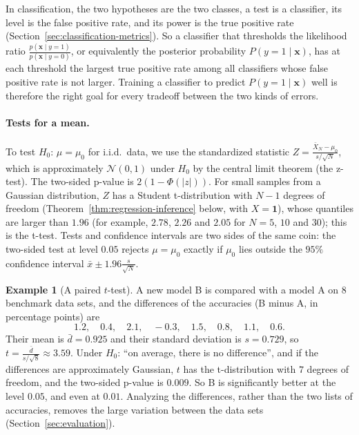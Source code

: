 \documentclass[11pt]{article}
\theoremstyle{definition}
\newtheorem{example}[definition]{Example}
\theoremstyle{plain}
\theoremstyle{remark}
\begin{document}
In classification, the two hypotheses are the two classes, a test is a classifier, its level is the false positive rate, and its power is the true positive rate (Section~\ref{sec:classification-metrics}). So a classifier that thresholds the likelihood ratio $\frac{p(\mathbf{x} \mid y = 1)}{p(\mathbf{x} \mid y = 0)}$, or equivalently the posterior probability $P(y = 1 \mid \mathbf{x})$, has at each threshold the largest true positive rate among all classifiers whose false positive rate is not larger. Training a classifier to predict $P(y = 1 \mid \mathbf{x})$ well is therefore the right goal for every tradeoff between the two kinds of errors.

\paragraph{Tests for a mean.} To test $H_0$: $\mu = \mu_0$ for i.i.d.\ data, we use the standardized statistic $Z = \frac{\bar X_N - \mu_0}{s/\sqrt{N}}$, which is approximately $\mathcal{N}(0, 1)$ under $H_0$ by the central limit theorem (the z-test). The two-sided p-value is $2(1 - \Phi(|z|))$. For small samples from a Gaussian distribution, $Z$ has a Student t-distribution with $N - 1$ degrees of freedom (Theorem~\ref{thm:regression-inference} below, with $X = \mathbf{1}$), whose quantiles are larger than $1.96$ (for example, $2.78$, $2.26$ and $2.05$ for $N = 5$, $10$ and $30$); this is the t-test. Tests and confidence intervals are two sides of the same coin: the two-sided test at level $0.05$ rejects $\mu = \mu_0$ exactly if $\mu_0$ lies outside the $95\%$ confidence interval $\bar x \pm 1.96\frac{s}{\sqrt{N}}$.

\begin{example}[A paired $t$-test]\label{ex:t-test}
    A new model B is compared with a model A on $8$ benchmark data sets, and the differences of the accuracies (B minus A, in percentage points) are
    \[1.2, \quad 0.4, \quad 2.1, \quad -0.3, \quad 1.5, \quad 0.8, \quad 1.1, \quad 0.6.\]
    Their mean is $\bar d = 0.925$ and their standard deviation is $s = 0.729$, so $t = \frac{\bar d}{s/\sqrt{8}} \approx 3.59$. Under $H_0$: ``on average, there is no difference'', and if the differences are approximately Gaussian, $t$ has the t-distribution with $7$ degrees of freedom, and the two-sided p-value is $0.009$. So B is significantly better at the level $0.05$, and even at $0.01$. Analyzing the differences, rather than the two lists of accuracies, removes the large variation between the data sets (Section~\ref{sec:evaluation}).
\end{example}
\end{document}

